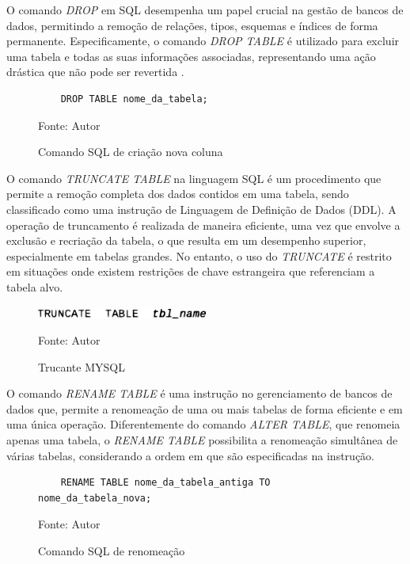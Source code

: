 
O comando \textit{DROP} em SQL desempenha um papel crucial na gestão de bancos de dados, permitindo a remoção de relações, tipos, esquemas e índices de forma permanente. Especificamente, o comando \textit{DROP TABLE} é utilizado para excluir uma tabela e todas as suas informações associadas, representando uma ação drástica que não pode ser revertida \cite{silberschatz2011database}.

\begin{figure}[h!]
    \centering
    \begin{lstlisting}
    DROP TABLE nome_da_tabela;
    \end{lstlisting}
    \caption{Comando SQL de criação nova coluna }
    Fonte: Autor
    \label{lst:sql_drop}
\end{figure}


O comando \textit{TRUNCATE TABLE} na linguagem SQL é um procedimento que permite a remoção completa dos dados contidos em uma tabela, sendo classificado como uma instrução de Linguagem de Definição de Dados (DDL). A operação de truncamento é realizada de maneira eficiente, uma vez que envolve a exclusão e recriação da tabela, o que resulta em um desempenho superior, especialmente em tabelas grandes. No entanto, o uso do \textit{TRUNCATE} é restrito em situações onde existem restrições de chave estrangeira que referenciam a tabela alvo.\cite{mySQL2025}

\begin{figure}
    \centering
    \includegraphics[width=0.5\textwidth]{figuras/truncate_mysql.eps}
    \caption{Trucante MYSQL}
    Fonte: Autor
    \label{fig:truncate}
\end{figure}



O comando \textit{RENAME TABLE} é uma instrução no gerenciamento de bancos de dados que, permite a renomeação de uma ou mais tabelas de forma eficiente e em uma única operação. Diferentemente do comando \textit{ALTER TABLE}, que renomeia apenas uma tabela, o \textit{RENAME TABLE} possibilita a renomeação simultânea de várias tabelas, considerando a ordem em que são especificadas na instrução. 

\begin{figure}[h!]
    \centering
    \begin{lstlisting}
    RENAME TABLE nome_da_tabela_antiga TO nome_da_tabela_nova;
    \end{lstlisting}
    \caption{Comando SQL de renomeação}
    Fonte: Autor
    \label{lst:sql_rename}
\end{figure}


